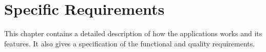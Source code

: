 \chapter{Specific Requirements}
This chapter contains a detailed description of how the applications works and its features. It also gives a specification of the functional and quality requirements.

	
	
	

	

	

	